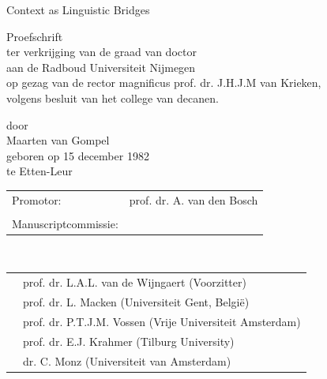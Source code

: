 \documentclass[11pt,makeidx,english,g5paper,openright]{style/phdthesis}
\author{Maarten van Gompel}
\theoremstyle{break}
\newcommand{\withdate}[1]{%
    \IfSubStringInString{\detokenize{withdate}}{\jobname}{#1}{}%
}
\begin{document}
\frontmatter

\pagestyle{plain}


\newpage

\begin{titlepage}
\begin{center}
\vspace{8cm}
{\Huge Context as Linguistic Bridges}

\vspace{6cm}
{\LARGE Proefschrift }\\
\vspace{1cm}
ter verkrijging van de graad van doctor\\
aan de Radboud Universiteit Nijmegen\\
op gezag van de rector magnificus prof. dr. J.H.J.M van Krieken,\\
volgens besluit van het college van decanen.\\
\withdate{}

\vspace{2cm}

door\\
Maarten van Gompel\\
geboren op 15 december 1982\\
te Etten-Leur


\vspace{0.5cm}


\end{center}

\clearpage

\thispagestyle{empty}
\begin{tabular}{ll}
Promotor: & prof. dr. A. van den Bosch \\
 & \\
Manuscriptcommissie: & \\
\end{tabular}
\\
\begin{tabular}{m{1cm}l}
 & prof. dr. L.A.L. van de Wijngaert (Voorzitter)  \\
 & prof. dr. L. Macken (Universiteit Gent, België) \\
 & prof. dr. P.T.J.M. Vossen (Vrije Universiteit Amsterdam) \\
 & prof. dr. E.J. Krahmer  (Tilburg University) \\
 & dr. C. Monz  (Universiteit van Amsterdam) \\
\end{tabular}


\vspace{5cm}


\end{titlepage}
\end{document}

